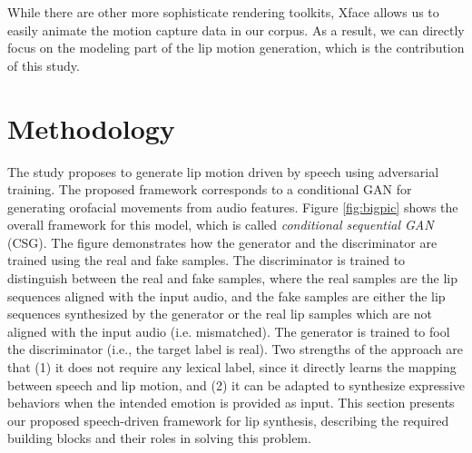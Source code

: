 \documentclass[10pt,journal,compsoc]{IEEEtran}
\begin{document}
While there are other more sophisticate rendering toolkits, Xface allows us to easily animate the motion capture data in our corpus. As a result, we can directly focus on the modeling part of the lip motion generation, which is the contribution of this study.

\section{Methodology}
\label{sec:methodology}
The study proposes to generate lip motion driven by speech using adversarial training. The proposed framework corresponds to a conditional GAN for generating orofacial movements from audio features. Figure \ref{fig:bigpic} shows the overall framework for this model, which is called \emph{conditional sequential GAN} (CSG). The figure demonstrates how the generator and the discriminator are trained using the real and fake samples. The discriminator is trained to distinguish between the real and fake samples, where the real samples are the lip sequences aligned with the input audio, and the fake samples are either the lip sequences synthesized by the generator or the real lip samples which are not aligned with the input audio (i.e. mismatched). The generator is trained to fool the discriminator (i.e., the target label is real).
Two strengths of the approach are that (1) it does not require any lexical label, since it directly learns the mapping between speech and lip motion, and (2) it can be adapted to synthesize expressive behaviors when the intended emotion is provided as input. This section presents our proposed speech-driven framework for lip synthesis, describing the required building blocks and their roles in solving this problem. 


	
\end{document}
